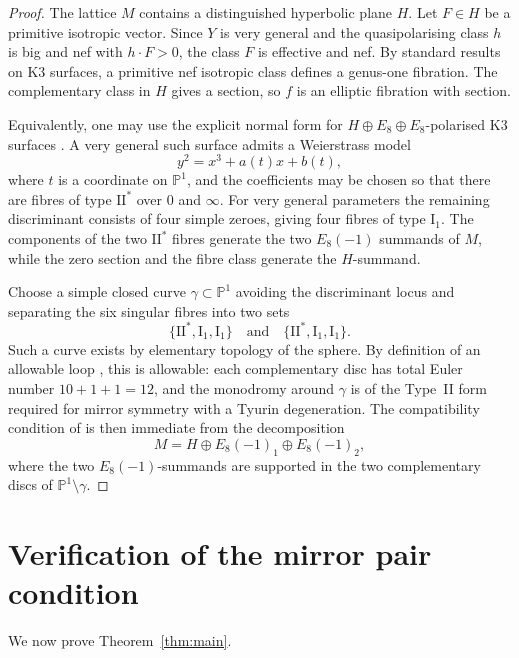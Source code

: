 \documentclass[11pt]{amsart}
\theoremstyle{definition}
\newcommand{\bP}{\mathbb P}
\begin{document}
\begin{proof}
The lattice $M$ contains a distinguished hyperbolic plane $H$. Let $F\in H$ be a primitive isotropic vector. Since $Y$ is very general and the quasipolarising class $h$ is big and nef with $h\cdot F>0$, the class $F$ is effective and nef. By standard results on K3 surfaces, a primitive nef isotropic class defines a genus-one fibration. The complementary class in $H$ gives a section, so $f$ is an elliptic fibration with section.

Equivalently, one may use the explicit normal form for $H\oplus E_8\oplus E_8$-polarised K3 surfaces \cite{CDLW09}. A very general such surface admits a Weierstrass model
\[
y^2=x^3+a(t)x+b(t),
\]
where $t$ is a coordinate on $\bP^1$, and the coefficients may be chosen so that there are fibres of type $\mathrm{II}^*$ over $0$ and $\infty$. For very general parameters the remaining discriminant consists of four simple zeroes, giving four fibres of type $\mathrm{I}_1$. The components of the two $\mathrm{II}^*$ fibres generate the two $E_8(-1)$ summands of $M$, while the zero section and the fibre class generate the $H$-summand.

Choose a simple closed curve $\gamma\subset\bP^1$ avoiding the discriminant locus and separating the six singular fibres into two sets
\[
\{\mathrm{II}^*,\mathrm{I}_1,\mathrm{I}_1\}
\quad\text{and}\quad
\{\mathrm{II}^*,\mathrm{I}_1,\mathrm{I}_1\}.
\]
Such a curve exists by elementary topology of the sphere. By definition of an allowable loop \cite[Definition~4.11]{GT24}, this is allowable: each complementary disc has total Euler number $10+1+1=12$, and the monodromy around $\gamma$ is of the Type~II form required for mirror symmetry with a Tyurin degeneration. The compatibility condition of \cite[Definition~4.21]{GT24} is then immediate from the decomposition
\[
M=H\oplus E_8(-1)_1\oplus E_8(-1)_2,
\]
where the two $E_8(-1)$-summands are supported in the two complementary discs of $\bP^1\setminus\gamma$.
\end{proof}

\section{Verification of the mirror pair condition}

We now prove Theorem~\ref{thm:main}.
\end{document}
